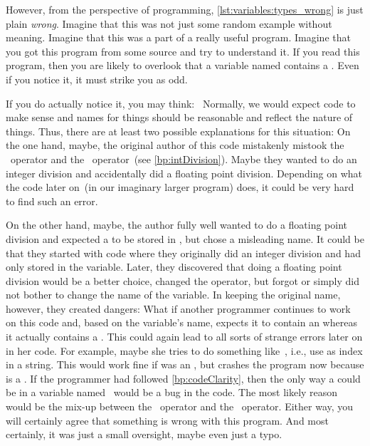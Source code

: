 However, from the perspective of programming, \cref{lst:variables:types_wrong} is just plain \emph{wrong}.
Imagine that this was not just some random example without meaning.
Imagine that this was a part of a really useful program.
Imagine that you got this program from some source and try to understand it.
If you read this program, then you are likely to overlook that a variable named  contains a .
Even if you notice it, it must strike you as odd.

If you do actually notice it, you may think:~
Normally, we would expect code to make sense and names for things should be reasonable and reflect the nature of things.
Thus, there are at least two possible explanations for this situation:
On the one hand, maybe, the original author of this code mistakenly mistook the \pythonilIdx{/}~operator and the \pythonilIdx{//}~operator~(see \cref{bp:intDivision}).
Maybe they wanted to do an integer division and accidentally did a floating point division.
Depending on what the code later on~(in our imaginary larger program) does, it could be very hard to find such an error.

On the other hand, maybe, the author fully well wanted to do a floating point division and expected a  to be stored in , but chose a misleading name.
It could be that they started with code where they originally did an integer division and had only  stored in the variable.
Later, they discovered that doing a floating point division would be a better choice, changed the operator, but forgot or simply did not bother to change the name of the variable.
In keeping the original name, however, they created dangers:
What if another programmer continues to work on this code and, based on the variable's name, expects it to contain an  whereas it actually contains a .
This could again lead to all sorts of strange errors later on in her code.
For example, maybe she tries to do something like~, i.e., use  as index in a string.
This would work fine if  was an , but crashes the program now because  is a .%
%
%
%
If the programmer had followed \cref{bp:codeClarity}, then the only way a  could be in a variable named~ would be a bug in the code.
The most likely reason would be the mix-up between the \pythonilIdx{/}~operator and the \pythonilIdx{//}~operator.
Either way, you will certainly agree that something is wrong with this program.
And most certainly, it was just a small oversight, maybe even just a typo.

